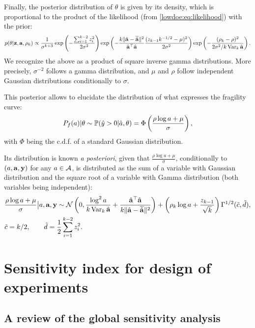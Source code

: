 Finally, the posterior distribution of $\theta$ is given by its density, which is proportional to the product of the likelihood (from \cref{lowdoe:eq:likelihood}) with the prior:
    \begin{equation}\label{lowdoe:eq:posterior}
        p(\theta|\mathbf{z}, \mathbf{a},\rho_k) \propto \frac{1}{\sigma^{k+3}} \exp\left({-\frac{\sum_{i=1}^{k-2}z_i^2}{2\sigma^2}}\right) \exp\left({-\frac{k\|\hat{\mathbf{a}}-\overline{\hat{\mathbf{a}}}\|^2}{\hat{\mathbf{a}}^{\top}\hat{\mathbf{a}}}\frac{(z_{k-1}k^{-1/2}-\mu)^2}{2\sigma^2}}\right)
            \exp\left({-\frac{(\rho_k-\rho)^2}{2\sigma^2/k\operatorname{Var}_k\hat{\mathbf{a}}}}\right).
    \end{equation}
We recognize the above as a product of square inverse gamma distributions. More precisely, $\sigma^{-2}$ follows a gamma distribution, and $\mu$ and $\rho$ follow independent Gaussian distributions conditionally to $\sigma$.

This posterior allows to elucidate the distribution of what expresses the fragility curve: 
\begin{equation}
    P_f(a)|\theta \sim \mathbb{P}( \hat y>0|\hat a,\theta) = \Phi\left(\frac{\rho\log a+\mu}{\sigma}\right) ,
\end{equation}
with $\Phi$ being the c.d.f. of a standard Gaussian distribution.

Its distribution is known \emph{a posteriori}, given that
$\frac{\rho\log a+\mu}{\sigma}$, conditionally to $(a,\mathbf{a},\mathbf{y})$ for any $a\in\mathcal{A}$, is distributed as the sum
of a variable with Gaussian distribution and the square root of a variable with Gamma distribution (both variables being independent):
\begin{align}
    &\frac{\rho\log a+\mu}{\sigma}\big| a,\mathbf{a},\mathbf{y} \sim \mathcal{N}\left(0,\frac{\log^2 a}{k\operatorname{Var}_k\hat{\mathbf{a}}} + \frac{\hat{\mathbf{a}}^{\top}\hat{\mathbf{a}}}{k\|\hat{\mathbf{a}} -\overline{\hat{\mathbf{a}}}\|^2} \right) + \left(\rho_k\log a + \frac{z_{k-1}}{\sqrt{k}}\right)\Gamma^{1/2}(\tilde c,\tilde d) \label{lowdoe:eq:apostcf} , \\
    &\tilde c = k/2, \qquad \tilde d = \frac{1}{2}\sum_{i=1}^{k-2}z_i^2.
\end{align}



\section{Sensitivity index for design of experiments}\label{lowdoe:sec:PE}

\subsection{A review of the global sensitivity analysis}

